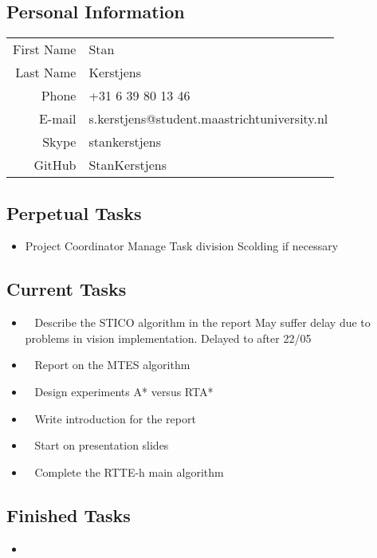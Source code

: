 \subsection{Personal Information}
\begin{table}[h!]
	\begin{tabular}{rl}
	First Name 	& Stan\\
	Last Name	& Kerstjens\\
	Phone		& +31 6 39 80 13 46\\
	E-mail		& s.kerstjens@student.maastrichtuniversity.nl\\
	Skype		& stankerstjens\\
	GitHub		& StanKerstjens
\end{tabular}
\end{table}

\subsection{Perpetual Tasks}
\begin{itemize}
	\item Project Coordinator
		\subitem Manage Task division
		\subitem Scolding if necessary
\end{itemize}

\subsection{Current Tasks}
\begin{itemize}
	\item~
	Describe the STICO algorithm in the report
		\subitem May suffer delay due to problems in vision implementation.
		\subitem Delayed to after 22/05
	\item~
	Report on the MTES algorithm
	\item~
	Design experiments
	\subitem A* versus RTA*
	\item~\marginpar{}
	Write introduction for the report
	\item~
	Start on presentation slides
	\item~
	Complete the RTTE-h main algorithm
\end{itemize}

\subsection{Finished Tasks}
\begin{itemize}
\item
\end{itemize}